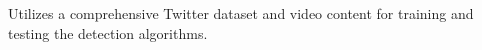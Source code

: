 Utilizes a comprehensive Twitter dataset and video content for training and testing the detection algorithms.